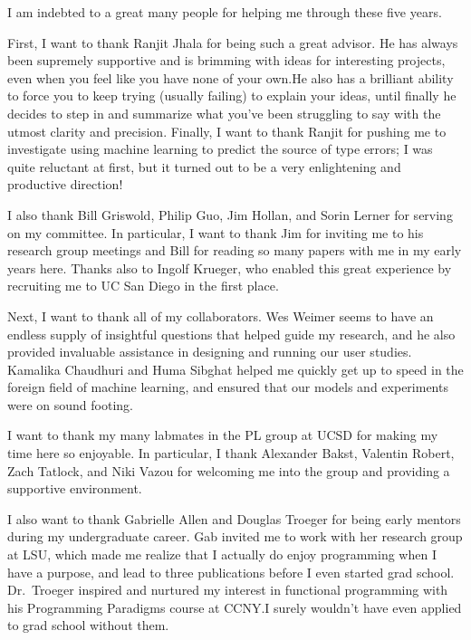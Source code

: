 \begin{acknowledgements}
  I am indebted to a great many people for helping me through these five
  years.

  First, I want to thank Ranjit Jhala for being such a great advisor.
  He has always been supremely supportive and is brimming with ideas for
  interesting projects, even when you feel like you have none of your
  own.He also has a brilliant ability to force you to keep trying
  (usually failing) to explain your ideas, until finally he decides to
  step in and summarize what you've been struggling to say with the
  utmost clarity and precision. Finally, I want to thank Ranjit for
  pushing me to investigate using machine learning to predict the source
  of type errors; I was quite reluctant at first, but it turned out to
  be a very enlightening and productive direction!

  I also thank Bill Griswold, Philip Guo, Jim Hollan, and Sorin Lerner
  for serving on my committee. In particular, I want to thank Jim for
  inviting me to his research group meetings and Bill for reading so
  many papers with me in my early years here. Thanks also to Ingolf
  Krueger, who enabled this great experience by recruiting me to UC
  San Diego in the first place.

  Next, I want to thank all of my collaborators. Wes Weimer seems to
  have an endless supply of insightful questions that helped guide my
  research, and he also provided invaluable assistance in designing and
  running our user studies. Kamalika Chaudhuri and Huma Sibghat helped
  me quickly get up to speed in the foreign field of machine learning,
  and ensured that our models and experiments were on sound footing.

  I want to thank my many labmates in the PL group at UCSD for making my
  time here so enjoyable. In particular, I thank Alexander Bakst,
  Valentin Robert, Zach Tatlock, and Niki Vazou for welcoming me into
  the group and providing a supportive environment.

  I also want to thank Gabrielle Allen and Douglas Troeger for being
  early mentors during my undergraduate career. Gab invited me to work
  with her research group at LSU, which made me realize that I actually
  do enjoy programming when I have a purpose, and lead to three
  publications before I even started grad school. Dr.\ Troeger inspired
  and nurtured my interest in functional programming with his
  Programming Paradigms course at CCNY.\@ I surely wouldn't have even
  applied to grad school without them.


\end{acknowledgements}
